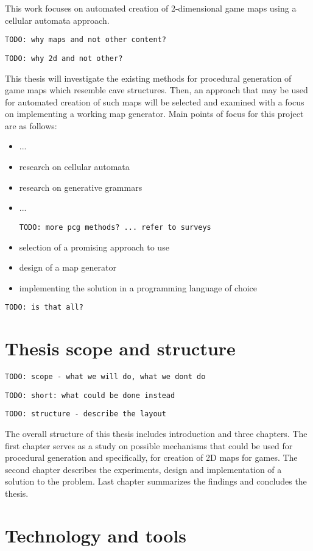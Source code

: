 \documentclass[12pt]{report}
\newcommand{\todo}[1]{}
\renewcommand{\todo}[1]{{\color{red} \par \noindent \footnotesize \texttt{TODO: {#1} }}}
\begin{document}
This work focuses on automated creation of 2-dimensional game maps using a cellular automata approach.  

\todo{why maps and not other content?}
\todo{why 2d and not other?}


This thesis will investigate the existing methods for procedural generation of game maps which resemble cave structures. Then, an approach that may be used for automated creation of such maps will be selected and examined with a focus on implementing a working map generator. Main points of focus for this project are as follows:

\begin{itemize}
	\item ...
	\item research on cellular automata
	\item research on generative grammars
	\item ... \todo{more pcg methods? ...  refer to surveys}
	\item selection of a promising approach to use
	\item design of a map generator
	\item implementing the solution in a programming language of choice
\end{itemize}

\todo{is that all?}

\section{Thesis scope and structure}

\todo{scope - what we will do, what we dont do}

\todo{short: what could be done instead}

\todo{structure - describe the layout}

The overall structure of this thesis includes introduction and three chapters. The first chapter serves as a study on possible mechanisms that could be used for procedural generation and specifically, for creation of 2D maps for games. The second chapter describes the experiments, design and implementation of a solution to the problem. Last chapter summarizes the findings and concludes the thesis.


\section{Technology and tools}
\end{document}
